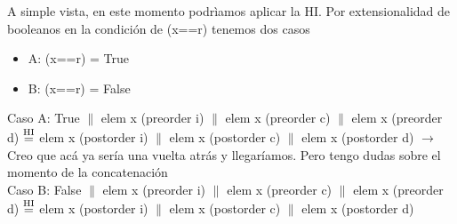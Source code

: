 \documentclass{article}
\begin{document}
A simple vista, en este momento podrìamos aplicar la HI. Por extensionalidad de booleanos en la condición de (x==r) tenemos dos casos
\begin{itemize}
\item A: (x==r) = True 
\item B: (x==r) = False
\end{itemize}
Caso A: True $\|$ elem x (preorder i) $\|$ elem x (preorder c) $\|$ elem x (preorder d) $\stackrel{\text{HI}}{=}$ elem x (postorder i) $\|$ elem x (postorder c)  $\|$ elem x (postorder d) $\rightarrow$ Creo que acá ya sería una vuelta atrás y llegaríamos. Pero tengo dudas sobre el momento de la concatenación \\
Caso B: False $\|$ elem x (preorder i) $\|$ elem x (preorder c) $\|$ elem x (preorder d) $\stackrel{\text{HI}}{=}$ elem x (postorder i) $\|$ elem x (postorder c)  $\|$ elem x (postorder d)
\end{document}

